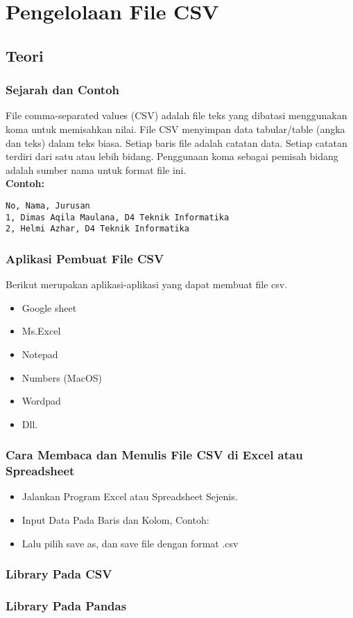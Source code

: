 \chapter{Pengelolaan File CSV}
\section{Teori}
\subsection{Sejarah dan Contoh}
File comma-separated values (CSV) adalah file teks yang dibatasi menggunakan koma untuk memisahkan nilai. File CSV menyimpan data tabular/table (angka dan teks) dalam teks biasa. Setiap baris file adalah catatan data. Setiap catatan terdiri dari satu atau lebih bidang. Penggunaan koma sebagai pemisah bidang adalah sumber nama untuk format file ini.\\
\textbf{Contoh:}
\begin{lstlisting}
No, Nama, Jurusan
1, Dimas Aqila Maulana, D4 Teknik Informatika
2, Helmi Azhar, D4 Teknik Informatika
\end{lstlisting}

\subsection{Aplikasi Pembuat File CSV}
Berikut merupakan aplikasi-aplikasi yang dapat membuat file csv.
\begin{itemize}
\item Google sheet
\item Ms.Excel
\item Notepad
\item Numbers (MacOS)
\item Wordpad
\item Dll.
\end{itemize}

\subsection{Cara Membaca dan Menulis File CSV di Excel atau Spreadsheet}
\begin{itemize}
\item Jalankan Program Excel atau Spreadsheet Sejenis.
\item Input Data Pada Baris dan Kolom, Contoh:
\item Lalu pilih save as, dan save file dengan format .csv
\end{itemize}

\subsection{Library Pada CSV}






\subsection{Library Pada Pandas}

